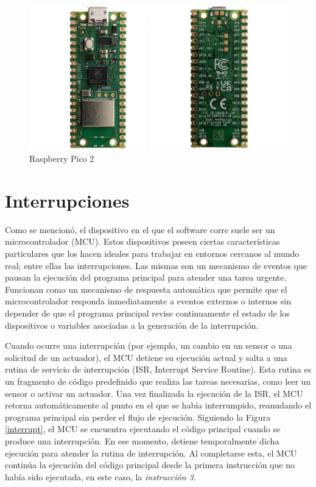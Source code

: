 \begin{figure}[h!]
	\caption{Raspberry Pico 2}
	\label{raspberry}
	\centering
    \includegraphics[width=0.6\linewidth]{raspberry_pico2.jpg}
\end{figure}


\section{Interrupciones}
\label{secInterrupciones}
Como se mencionó, el dispositivo en el que el software corre suele ser un microcontrolador (\gls{MCU}). Estos dispositivos poseen ciertas características particulares que los hacen ideales para trabajar en entornos cercanos al mundo real; entre ellas las interrupciones. Las mismas son un mecanismo de eventos que pausan la ejecución del programa principal para atender una tarea urgente. Funcionan como un mecanismo de respuesta automática que permite que el microcontrolador responda inmediatamente a eventos externos o internos sin depender de que el programa principal revise continuamente el estado de los dispositivos o variables asociadas a la generación de la interrupción.

Cuando ocurre una interrupción (por ejemplo, un cambio en un sensor o una solicitud de un actuador), el \gls{MCU} detiene su ejecución actual y salta a una rutina de servicio de interrupción (ISR, Interrupt Service Routine). Esta rutina es un fragmento de código predefinido que realiza las tareas necesarias, como leer un sensor o activar un actuador. Una vez finalizada la ejecución de la ISR, el \gls{MCU} retorna automáticamente al punto en el que se había interrumpido, reanudando el programa principal sin perder el flujo de ejecución. Siguiendo la Figura \ref{interrupt}, el \gls{MCU} se encuentra ejecutando el código principal cuando se produce una interrupción. En ese momento, detiene temporalmente dicha ejecución para atender la rutina de interrupción. Al completarse esta, el \gls{MCU} continúa la ejecución del código principal desde la primera instrucción que no había sido ejecutada, en este caso, la \textit{instrucción 3}.

